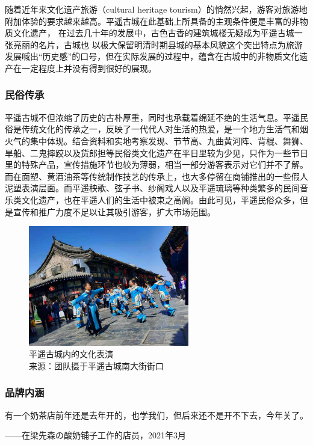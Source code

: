 \documentclass[UTF8]{ctexart}
\begin{document}
    随着近年来文化遗产旅游（cultural heritage tourism）的悄然兴起，游客对旅游地附加体验的要求越来越高。平遥古城在此基础上所具备的主观条件便是丰富的非物质文化遗产， 在过去几十年的发展中，古色古香的建筑城楼无疑成为平遥古城一张亮丽的名片，古城也 以极大保留明清时期县城的基本风貌这个突出特点为旅游发展喊出“历史感”的口号，但在实际发展的过程中，蕴含在古城中的非物质文化遗产在一定程度上并没有得到很好的展现。        \subsubsection{民俗传承}
        平遥古城不但浓缩了历史的古朴厚重，同时也承载着绵延不绝的生活气息。平遥民俗是传统文化的传承之一，反映了一代代人对生活的热爱，是一个地方生活气和烟火气的集中体现。结合资料和实地考察发现、节节高、九曲黄河阵、背棍、舞狮、旱船、二鬼摔跤以及货郎担等民俗类文化遗产在平日里较为少见，只作为一些节日里的特殊产品，宣传措施环节也较为薄弱，相当一部分游客表示对它们并不了解。而在面塑、黄酒油茶等传统制作技艺的传承上，也大多停留在商铺推出的一些假人泥塑表演层面。而平遥秧歌、弦子书、纱阁戏人以及平遥琉璃等种类繁多的民间音乐类文化遗产，也在平遥人们的生活中被束之高阁。由此可见，平遥民俗众多，但是宣传和推广力度不足以让其吸引游客，扩大市场范围。      
        \begin{figure}[H]
            \centering
            \includegraphics[width=7cm]{表演.jpg}
            \caption[plain]{平遥古城内的文化表演\\来源：团队摄于平遥古城南大街街口}
            \label{fig:my_label}
        \end{figure}
        \subsubsection{品牌内涵}
        有一个奶茶店前年还是去年开的，也学我们，但后来还不是开不下去，今年关了。
        
        \begin{flushright}
            ——在梁先森の酸奶铺子工作的店员，2021年3月
        \end{flushright}   
        
\end{document}
